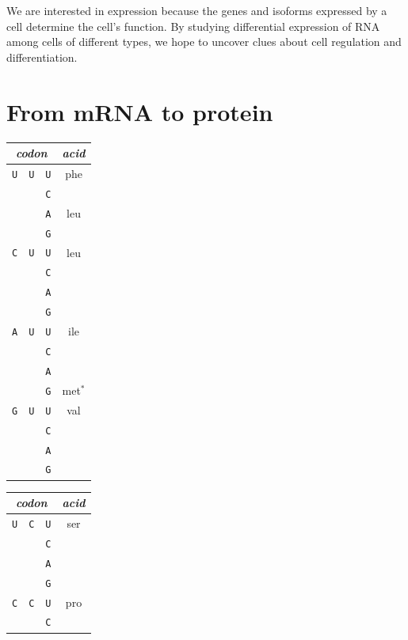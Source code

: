 \documentclass[11pt]{report}
\newcommand{\mybase}[1]{\texttt{#1}\xspace}
\newcommand{\baseA}{\mybase{A}}
\newcommand{\baseC}{\mybase{C}}
\newcommand{\baseG}{\mybase{G}}
\newcommand{\baseU}{\mybase{U}}
\begin{document}
We are interested in expression because the genes and isoforms
expressed by a cell determine the cell's function. By studying
differential expression of RNA among cells of different types, we hope
to uncover clues about cell regulation and differentiation.

\section{From mRNA to protein}

\begin{table}[t!]
  \centering\small
  \setlength\doublerulesep{4pt}
  \setlength{\tabcolsep}{4pt}
  \centering\small
  \begin{tabular}{|ccc|c|}
    \hline
    \multicolumn{3}{|c|}{\textit{codon}} & \textit{acid}
    \\ \hline \hline
    \baseU & \baseU & \baseU & phe
    \\ &        & \baseC &
    \\ \hline
    &  & \baseA & leu
    \\ & & \baseG &
    \\ \hline \hline
    \baseC & \baseU & \baseU & leu
    \\ & & \baseC &
    \\ & & \baseA &
    \\ & & \baseG &
    \\ \hline \hline
    \baseA & \baseU & \baseU & ile
    \\ & & \baseC &
    \\ & & \baseA &
    \\ \hline
    &  & \baseG & met$^*$
    \\ \hline \hline
    \baseG & \baseU & \baseU & val
    \\ & & \baseC &
    \\ & & \baseA &
    \\ & & \baseG &
    \\ \hline
  \end{tabular}
  \qquad
  \begin{tabular}{|ccc|c|}
    \hline
    \multicolumn{3}{|c|}{\textit{codon}} & \textit{acid}
    \\ \hline \hline
    \baseU & \baseC & \baseU & ser
    \\ & & \baseC &
    \\ & & \baseA &
    \\ & & \baseG &
    \\ \hline \hline
    \baseC & \baseC & \baseU & pro
    \\ & & \baseC &

\end{tabular}
\end{table}
\end{document}
